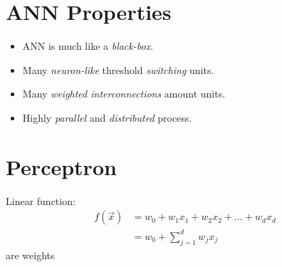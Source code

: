 \documentclass[
	number={8},
	title={Artificial Neural Network}
]{cs584notes}
\begin{document}
\section{ANN Properties}\label{sec:ann-properties}
\begin{itemize}
	\item ANN is much like a \emph{black-box}.
	\item Many \emph{neuron-like} threshold \emph{switching} units.
	\item Many \emph{weighted interconnections} amount units.
	\item Highly \emph{parallel} and \emph{distributed} process.
\end{itemize}

\section{Perceptron}\label{sec:perceptron}
Linear function: 
\begin{equation*}
\begin{aligned}
	f(\vec{x}) &= w_{0} + w_{1}x_{1} + w_{2}x_{2} + \dots + w_{d}x_{d}\\
	&= w_{0} + \sum_{j=1}^{d} w_{j}x_{j}
\end{aligned}
\end{equation*}
 are weights
\end{document}
